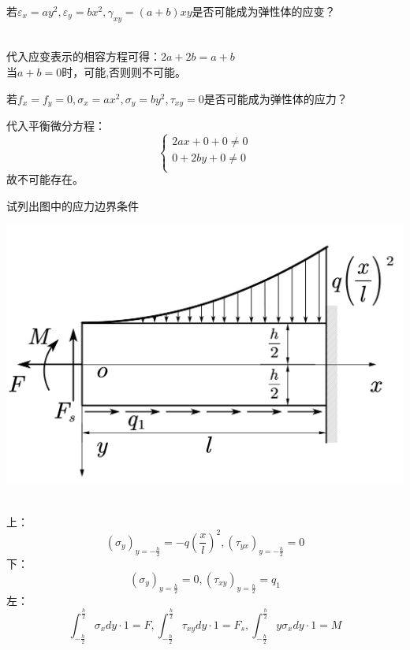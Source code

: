 \begin{example}
	若$\varepsilon _x=ay^2,\varepsilon _y=bx^2,\gamma _{xy}=\left( a+b \right) xy$是否可能成为弹性体的应变？
\end{example}
\begin{remark}
	\quad\\
	代入应变表示的相容方程可得：$2a+2b=a+b$\\
	当$a+b=0$时，可能,否则则不可能。
\end{remark}

\begin{example}
若$f_x=f_y=0,\sigma _x=ax^2,\sigma _y=by^2,\tau _{xy}=0$是否可能成为弹性体的应力？
\end{example}
\begin{remark}
	代入平衡微分方程：\[\begin{cases}
	2ax+0+0\ne 0\\
	0+2by+0\ne 0\\
	\end{cases}\]
	故不可能存在。
\end{remark}

\begin{example}
	试列出图中的应力边界条件
\end{example}
\centerline{\includegraphics[scale=0.5]{figure/2-10.png}}
	\begin{remark}
		\quad\\
		上：\[\left( \sigma _y \right) _{y=-\frac{h}{2}}=-q\left( \frac{x}{l} \right) ^2,\left( \tau _{yx} \right) _{y=-\frac{h}{2}}=0\]
		下：\[\left( \sigma _y \right) _{y=\frac{h}{2}}=0,\left( \tau _{xy} \right) _{y=\frac{h}{2}}=q_1\]
		左：\[\int_{-\frac{h}{2}}^{\frac{h}{2}}{\sigma _xdy\cdot 1=F},\int_{-\frac{h}{2}}^{\frac{h}{2}}{\tau _{xy}dy\cdot 1}=F_s,\int_{-\frac{h}{2}}^{\frac{h}{2}}{y\sigma _xdy\cdot 1}=M\]
	\end{remark}


